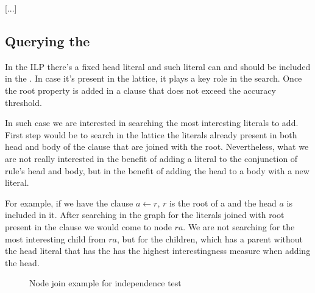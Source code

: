 [...]

\subsection{Querying the \graphname}

In the ILP there's a fixed head literal and such literal can and should be included in the \graphname. In case it's
present in the lattice, it plays a key role in the search. Once the root property is added in a clause that does not
exceed the accuracy threshold.

In such case we are interested in searching the most interesting literals to add. First step would be to search in the
lattice the literals already present in both head and body of the clause that are joined with the root. Nevertheless,
what we are not really interested in the benefit of adding a literal to the conjunction of rule's head and body, but in
the benefit of adding the head to a body with a new literal.

For example, if we have the clause $a \leftarrow r$, $r$ is the root of a \graphname and the head $a$ is included in it.
After searching in the graph for the literals joined with root present in the clause we would come to node
$ra$. We are not searching for the most interesting child from $ra$, but for the children, which has a parent without
the head literal that has the has the highest interestingness measure when adding the head.

\begin{figure}[!h]
  \caption{Node join example for independence test}
  \centering
  \label{fig:latticeSuggestion}
\end{figure}

